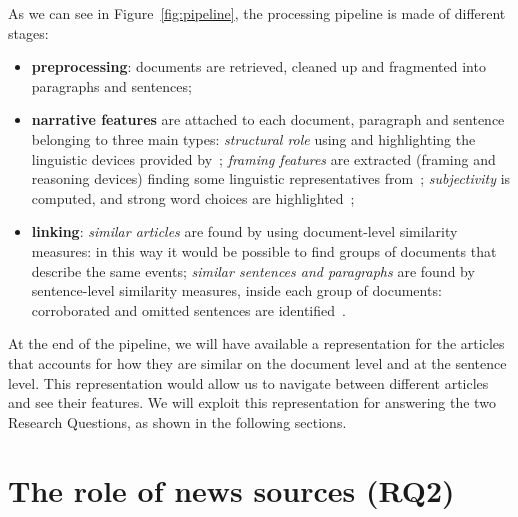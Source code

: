 As we can see in Figure~\ref{fig:pipeline}, the processing pipeline is made of different stages:
\begin{itemize}
    \item \textbf{preprocessing}: documents are retrieved, cleaned up and fragmented into paragraphs and sentences;
    \item \textbf{narrative features} are attached to each document, paragraph and sentence belonging to three main types:
    \emph{structural role} using and highlighting the linguistic devices provided by~\cite{zahid2019towards};
    \emph{framing features} are extracted (framing and reasoning devices) finding some linguistic representatives from~\cite{gamson1989media,fillmore2006frame};
    \emph{subjectivity} is computed, and strong word choices are highlighted~\cite{liu2010sentiment};
    \item \textbf{linking}: \emph{similar articles} are found by using document-level similarity measures: in this way it would be possible to find groups of documents that describe the same events; \emph{similar sentences and paragraphs} are found by sentence-level similarity measures, inside each group of documents: corroborated and omitted sentences are identified~\cite{bountouridis2018explaining}.
\end{itemize}

At the end of the pipeline, we will have available a representation for the articles that accounts for how they are similar on the document level and at the sentence level.
This representation would allow us to navigate between different articles and see their features. We will exploit this representation for answering the two Research Questions, as shown in the following sections.


\section{The role of news sources (RQ2)}
\label{sec:prop_rq2}

